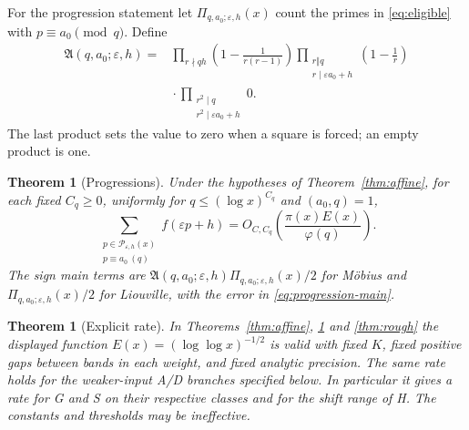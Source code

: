 \documentclass[11pt]{article}
\newtheorem{theoremB}{Theorem}
\newtheorem{theoremC}{Theorem}
\theoremstyle{definition}
\theoremstyle{remark}
\numberwithin{equation}{section}
\begin{document}
For the progression statement let $\Pi_{q,a_0;\varepsilon,h}(x)$
count the primes in \eqref{eq:eligible} with $p\equiv a_0\pmod q$.
Define
\begin{equation}\label{eq:progression-factor}
\begin{split}
 \mathfrak A(q,a_0;\varepsilon,h)
 ={}&\prod_{r\nmid qh}\left(1-\frac1{r(r-1)}\right)
      \prod_{\substack{r\Vert q\\r\mid\varepsilon a_0+h}}
                    \left(1-\frac1r\right)\\
 &{}\cdot\prod_{\substack{r^2\mid q\\r^2\mid\varepsilon a_0+h}}0.
\end{split}
\end{equation}
The last product sets the value to zero when a square is forced;
an empty product is one.
\begin{theoremB}[Progressions]\label{thm:progression}
Under the hypotheses of Theorem~\ref{thm:affine}, for each fixed
$C_q\ge0$, uniformly for $q\le(\log x)^{C_q}$ and $(a_0,q)=1$,
\begin{equation}\label{eq:progression-main}
 \sum_{\substack{p\in\mathcal P_{\varepsilon,h}(x)\\p\equiv a_0\ (q)}}
 f(\varepsilon p+h)
 =O_{C,C_q}\left(\frac{\pi(x)E(x)}{\varphi(q)}\right).
\end{equation}
The sign main terms are
$\mathfrak A(q,a_0;\varepsilon,h)\Pi_{q,a_0;\varepsilon,h}(x)/2$
for M\"obius and $\Pi_{q,a_0;\varepsilon,h}(x)/2$ for Liouville,
with the error in \eqref{eq:progression-main}.
\end{theoremB}

\begin{theoremC}[Explicit rate]\label{thm:rate}
In Theorems~\ref{thm:affine}, \ref{thm:progression} and
\ref{thm:rough} the displayed function
$E(x)=(\log\log x)^{-1/2}$ is valid with fixed $K$, fixed
positive gaps between bands in each weight, and fixed analytic
precision. The same rate holds for the weaker-input A/D branches
specified below. In particular it gives a rate for G and S on their
respective classes and for the shift range of H.
The constants and thresholds may be ineffective.
\end{theoremC}
\end{document}
